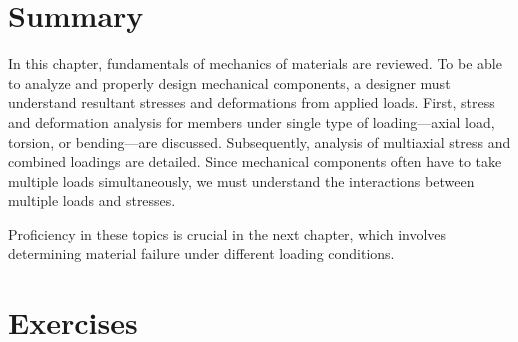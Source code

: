 \documentclass[
10pt,
a4paper,
openany,
svgnames,
]{book}
\begin{document}
\section*{Summary}

In this chapter, fundamentals of mechanics of materials are reviewed. To be able to analyze and properly design mechanical components, a designer must understand resultant stresses and deformations from applied loads. First, stress and deformation analysis for members under single type of loading—axial load, torsion, or bending—are discussed. Subsequently, analysis of multiaxial stress and combined loadings are detailed. Since mechanical components often have to take multiple loads simultaneously, we must understand the interactions between multiple loads and stresses.

Proficiency in these topics is crucial in the next chapter, which involves determining material failure under different loading conditions.

\section*{Exercises}
\end{document}
